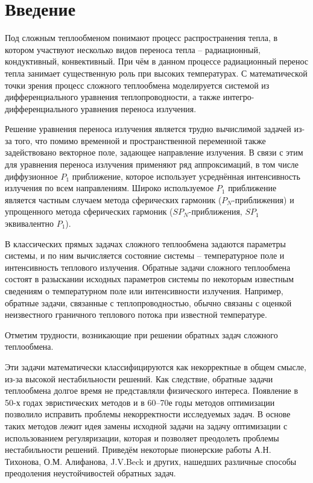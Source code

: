 \section{Введение}
Под сложным теплообменом понимают процесс распространения тепла,
в котором участвуют несколько видов переноса тепла – радиационный, кондуктивный, конвективный.
При чём в данном процессе радиационный перенос тепла занимает существенную роль при высоких температурах.
С математической точки зрения процесс сложного теплообмена моделируется системой из
дифференциального уравнения теплопроводности, а также интегро-дифференциального уравнения переноса излучения.


Решение уравнения переноса излучения является трудно вычислимой задачей из-за того,
что помимо временной и пространственной переменной также задействовано
векторное поле, задающее направление излучения.
В связи с этим для уравнения переноса излучения применяют ряд аппроксимаций,
в том числе диффузионное $P_1$ приближение, которое использует
усреднённая интенсивность излучения по всем направлениям.
Широко используемое $P_1$ приближение является частным случаем метода сферических
гармоник ($P_N$-приближения) и упрощенного метода сферических гармоник
($SP_N$-приближения, $SP_1$ эквивалентно $P_1$).


В классических прямых задачах сложного теплообмена задаются параметры системы, и по ним вычисляется
состояние системы – температурное поле и интенсивность теплового излучения.
Обратные задачи сложного теплообмена состоят в разыскании исходных параметров системы по некоторым
известным сведениям о температурном поле или интенсивности излучения.
Например, обратные задачи, связанные с теплопроводностью, обычно связаны с
оценкой неизвестного граничного теплового потока при известной температуре.


Отметим трудности, возникающие при решении обратных задач сложного теплообмена.


Эти задачи математически классифицируются как некорректные в общем смысле, из-за высокой нестабильности решений.
Как следствие, обратные задачи теплообмена долгое время не представляли физического интереса.
Появление в 50-х годах эвристических методов и в 60–70е годы методов оптимизации
позволило исправить проблемы некорректности исследуемых задач.
В основе таких методов лежит идея замены исходной задачи на задачу оптимизации
с использованием регуляризации, которая и позволяет преодолеть проблемы нестабильности решений.
Приведём некоторые пионерские работы А.Н. Тихонова, О.М. Алифанова, J.V.Beck и других, нашедших различные способы
преодоления неустойчивостей обратных задач.


